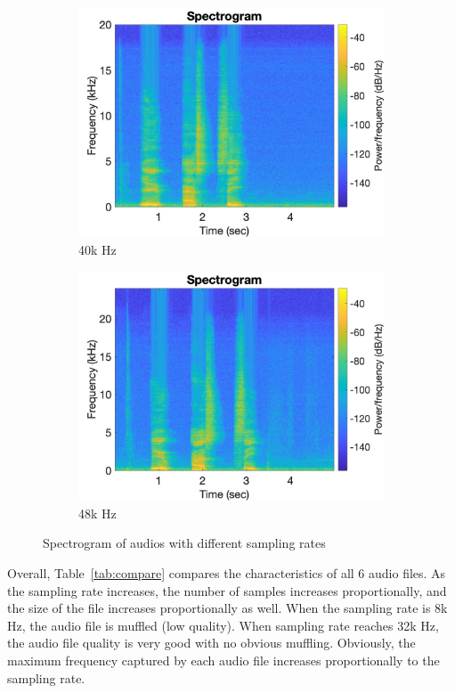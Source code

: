 \documentclass[11pt, oneside]{article}   	%
\begin{document}
\begin{figure}[ht]
\begin{subfigure}[b]{0.3\textwidth}
\includegraphics[width=\textwidth]{imgs/40k-spectrogram.jpg}
\caption{40k Hz}
\end{subfigure}
\begin{subfigure}[b]{0.3\textwidth}
\includegraphics[width=\textwidth]{imgs/48k-spectrogram.jpg}
\caption{48k Hz}
\end{subfigure}

\caption{Spectrogram of audios with different sampling rates}
\label{fig:spectrogram}
\end{figure}

Overall, Table~\ref{tab:compare} compares the characteristics of all 6 audio files. As the sampling rate increases, the number of samples increases proportionally, and the size of the file increases proportionally as well. When the sampling rate is 8k Hz, the audio file is muffled (low quality). When sampling rate reaches 32k Hz, the audio file quality is very good with no obvious muffling. Obviously, the maximum frequency captured by each audio file increases proportionally to the sampling rate.
\end{document}
